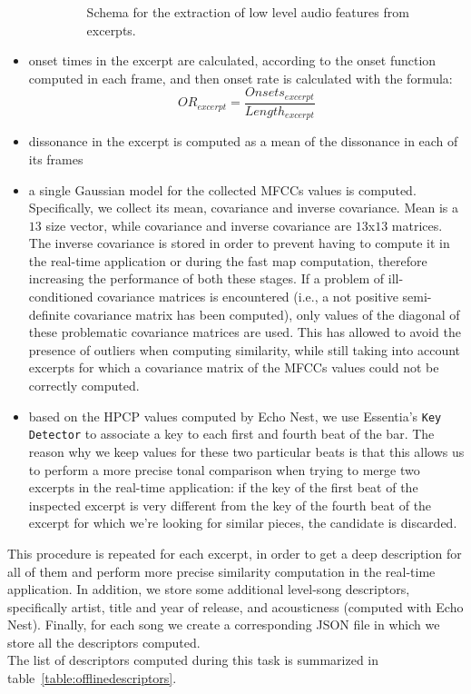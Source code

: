 \begin{itemize}
\begin{itemize}
\begin{figure}[h]
\caption[Schema for the extraction of low level features from excerpts]{Schema for the extraction of low level audio features from excerpts.}
\label{fig:extraction}
\end{figure}
\end{itemize}
\item onset times in the excerpt are calculated, according to the onset function computed in each frame, and then onset rate is calculated with the formula:
\begin{equation}
OR_{excerpt} = \frac{Onsets_{excerpt}}{Length_{excerpt}}
\end{equation}
\item dissonance in the excerpt is computed as a mean of the dissonance in each of its frames
\item a single Gaussian model for the collected MFCCs values is computed. Specifically, we collect its mean, covariance and inverse covariance. Mean is a $13$ size vector, while covariance and inverse covariance are $13$x$13$ matrices. The inverse covariance is stored in order to prevent having to compute it in the real-time application or during the fast map computation, therefore increasing the performance of both these stages. If a problem of ill-conditioned covariance matrices is encountered (i.e., a not positive semi-definite covariance matrix has been computed), only values of the diagonal of these problematic covariance matrices are used. This has allowed to avoid the presence of outliers when computing similarity, while still taking into account excerpts for which a covariance matrix of the MFCCs values could not be correctly computed. 
\item based on the HPCP values computed by Echo Nest, we use Essentia's \texttt{Key Detector} to associate a key to each first and fourth beat of the bar. The reason why we keep values for these two particular beats is that this allows us to perform a more precise tonal comparison when trying to merge two excerpts in the real-time application: if the key of the first beat of the inspected excerpt is very different from the key of the fourth beat of the excerpt for which we're looking for similar pieces, the candidate is discarded.
\end{itemize} 
This procedure is repeated for each excerpt, in order to get a deep description for all of them and perform more precise similarity computation in the real-time application. In addition, we store some additional level-song descriptors, specifically artist, title and year of release, and acousticness (computed with Echo Nest). Finally, for each song we create a corresponding JSON file in which we store all the descriptors computed. \\
The list of descriptors computed during this task is summarized in table~\ref{table:offlinedescriptors}.

